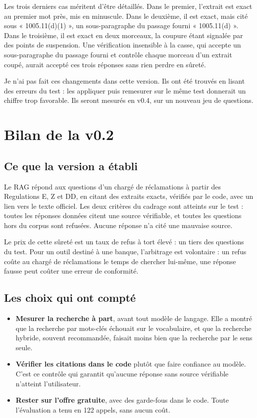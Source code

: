 \documentclass[11pt,a4paper]{article}
\begin{document}
Les trois derniers cas méritent d'être détaillés. Dans le premier, l'extrait est exact au premier mot près, mis en minuscule. Dans le deuxième, il est exact, mais cité sous « 1005.11(d)(1) », un sous-paragraphe du passage fourni « 1005.11(d) ». Dans le troisième, il est exact en deux morceaux, la coupure étant signalée par des points de suspension. Une vérification insensible à la casse, qui accepte un sous-paragraphe du passage fourni et contrôle chaque morceau d'un extrait coupé, aurait accepté ces trois réponses sans rien perdre en sûreté.

Je n'ai pas fait ces changements dans cette version. Ils ont été trouvés en lisant des erreurs du test : les appliquer puis remesurer sur le même test donnerait un chiffre trop favorable. Ils seront mesurés en v0.4, sur un nouveau jeu de questions.

\section{Bilan de la v0.2}

\subsection{Ce que la version a établi}

Le RAG répond aux questions d'un chargé de réclamations à partir des Regulations E, Z et DD, en citant des extraits exacts, vérifiés par le code, avec un lien vers le texte officiel. Les deux critères du cadrage sont atteints sur le test : toutes les réponses données citent une source vérifiable, et toutes les questions hors du corpus sont refusées. Aucune réponse n'a cité une mauvaise source.

Le prix de cette sûreté est un taux de refus à tort élevé : un tiers des questions du test. Pour un outil destiné à une banque, l'arbitrage est volontaire : un refus coûte au chargé de réclamations le temps de chercher lui-même, une réponse fausse peut coûter une erreur de conformité.

\subsection{Les choix qui ont compté}

\begin{itemize}
  \item \textbf{Mesurer la recherche à part}, avant tout modèle de langage. Elle a montré que la recherche par mots-clés échouait sur le vocabulaire, et que la recherche hybride, souvent recommandée, faisait moins bien que la recherche par le sens seule.
  \item \textbf{Vérifier les citations dans le code} plutôt que faire confiance au modèle. C'est ce contrôle qui garantit qu'aucune réponse sans source vérifiable n'atteint l'utilisateur.
  \item \textbf{Rester sur l'offre gratuite}, avec des garde-fous dans le code. Toute l'évaluation a tenu en 122 appels, sans aucun coût.
\end{itemize}
\end{document}
